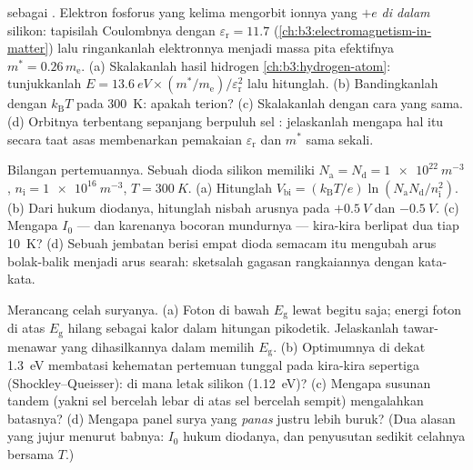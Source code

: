 \begin{exercise}[$\star\star\star$]\label{exo:b3:electrons-in-solids:10}
 sebagai . Elektron fosforus yang kelima
mengorbit ionnya yang $+e$ \emph{di dalam} silikon: tapisilah Coulombnya dengan
$\varepsilon_{\text{r}} = 11.7$
(\cref{ch:b3:electromagnetism-in-matter}) lalu ringankanlah
elektronnya menjadi massa pita efektifnya $m^* = 0.26\,m_{\text{e}}$.
(a) Skalakanlah hasil hidrogen \cref{ch:b3:hydrogen-atom}:
tunjukkanlah $E = \qty{13.6}{eV}\times(m^*/m_{\text{e}})/
\varepsilon_{\text{r}}^2$ lalu hitunglah. (b) Bandingkanlah dengan
$k_{\text{B}}T$ pada \qty{300}{K}: apakah  terion? (c) Skalakanlah
 dengan cara yang sama. (d) Orbitnya terbentang sepanjang berpuluh
sel : jelaskanlah mengapa hal itu secara taat asas membenarkan
pemakaian $\varepsilon_{\text{r}}$ dan $m^*$ sama sekali.
\end{exercise}

\begin{exercise}[$\star\star\star$]\label{exo:b3:electrons-in-solids:11}
Bilangan pertemuannya. Sebuah dioda silikon memiliki $N_{\text{a}} =
N_{\text{d}} = \qty{1e22}{m^{-3}}$, $n_{\text{i}} =
\qty{1e16}{m^{-3}}$, $T = \qty{300}{K}$. (a) Hitunglah
$V_{\text{bi}} = (k_{\text{B}}T/e)\ln(N_{\text{a}}N_{\text{d}}/
n_{\text{i}}^2)$. (b) Dari hukum diodanya, hitunglah nisbah
arusnya pada $+\qty{0.5}{V}$ dan $-\qty{0.5}{V}$. (c) Mengapa
$I_0$ --- dan karenanya bocoran mundurnya --- kira-kira berlipat dua tiap
\qty{10}{K}? (d) Sebuah jembatan berisi empat dioda semacam itu mengubah arus
bolak-balik menjadi arus searah: sketsalah gagasan rangkaiannya dengan kata-kata.
\end{exercise}

\begin{exercise}[$\star\star\star$]\label{exo:b3:electrons-in-solids:12}
Merancang celah suryanya. (a) Foton di bawah $E_{\text{g}}$ lewat
begitu saja; energi foton di atas $E_{\text{g}}$ hilang sebagai kalor
dalam hitungan pikodetik. Jelaskanlah tawar-menawar yang dihasilkannya dalam memilih
$E_{\text{g}}$. (b) Optimumnya di dekat \qty{1.3}{eV} membatasi
kehematan pertemuan tunggal pada kira-kira sepertiga
(Shockley--Queisser): di mana letak silikon
(\qty{1.12}{eV})? (c) Mengapa susunan tandem (yakni sel bercelah lebar
di atas sel bercelah sempit) mengalahkan batasnya? (d) Mengapa panel surya
yang \emph{panas} justru lebih buruk? (Dua alasan yang jujur menurut babnya:
$I_0$ hukum diodanya, dan penyusutan sedikit celahnya bersama $T$.)
\end{exercise}

